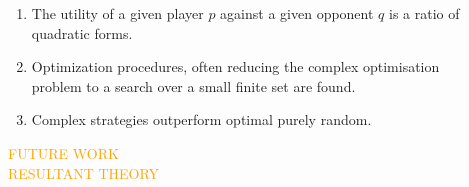 \documentclass[usenames,dvipsnames,t]{beamer}
\begin{document}
\begin{columns}
\begin{column}{.4\linewidth}
        
    \end{column}
    \begin{column}{.2\linewidth}
        \begin{enumerate}
            \item The utility of a given player \(p\) against a given opponent \(q\) 
            is a ratio of quadratic forms.
            \item Optimization procedures, often reducing the complex optimisation 
            problem to a search over a small finite set are found.
            \item Complex strategies outperform optimal purely random.
        \end{enumerate}
        \vspace{1cm}

        \begin{center}
            \textcolor{orange}{\Large{FUTURE WORK}} \\
            \textcolor{orange}{\small{RESULTANT THEORY}}
        \end{center}
    \begin{center}
        
    \end{center}
    \end{column}
\end{columns}
\vspace{1cm}
\end{document}
